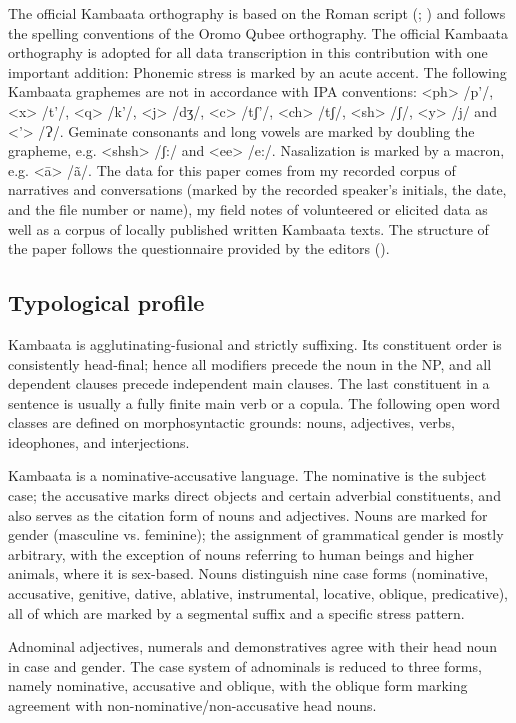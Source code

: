 \documentclass[output=paper,colorlinks,citecolor=brown,draftmode
]{langscibook}
\begin{document}
The official Kambaata orthography is based on the Roman script (\citealt[73--80]{Treis2008}; \citealt{Alemu2016}) and follows the spelling conventions of the Oromo Qubee orthography. The official Kambaata orthography is adopted for all data transcription in this contribution with one important addition: Phonemic stress is marked by an acute accent. The following Kambaata graphemes are not in accordance with IPA conventions: <ph> /p’/, <x> /t’/, <q> /k’/, <j> /dʒ/, <c> /tʃ’/, <ch> /tʃ/, <sh> /ʃ/, <y> /j/ and <’> /Ɂ/. Geminate consonants and long vowels are marked by doubling the grapheme, e.g. <shsh> /ʃ:/ and <ee> /e:/. Nasalization is marked by a macron, e.g. <ā> /ã/. The data for this paper comes from my recorded corpus of narratives and conversations (marked by the recorded speaker’s initials, the date, and the file number or name), my field notes of volunteered or elicited data as well as a corpus of locally published written Kambaata texts. The structure of the paper follows the questionnaire provided by the editors ().

\subsection{Typological profile}\label{sec:treis:1.2}

Kambaata is agglutinating-fusional and strictly suffixing. Its constituent order is consistently head-final; hence all modifiers precede the noun in the NP, and all dependent clauses precede independent main clauses. The last constituent in a sentence is usually a fully finite main verb or a copula. The following open word classes are defined on morphosyntactic grounds: nouns, adjectives, verbs, ideophones, and interjections.

Kambaata is a nominative-accusative language. The nominative is the subject case; the accusative marks direct objects and certain adverbial constituents, and also serves as the citation form of nouns and adjectives. Nouns are marked for gender (masculine vs. feminine); the assignment of grammatical gender is mostly arbitrary, with the exception of nouns referring to human beings and higher animals, where it is sex-based. Nouns distinguish nine case forms (nominative, accusative, genitive, dative, ablative, instrumental, locative, oblique, predicative), all of which are marked by a segmental suffix and a specific stress pattern.  

Adnominal adjectives, numerals and demonstratives agree with their head noun in case and gender. The case system of adnominals is reduced to three forms, namely nominative, accusative and oblique, with the oblique form marking agreement with non-nominative/non-accusative head nouns.
\end{document}
